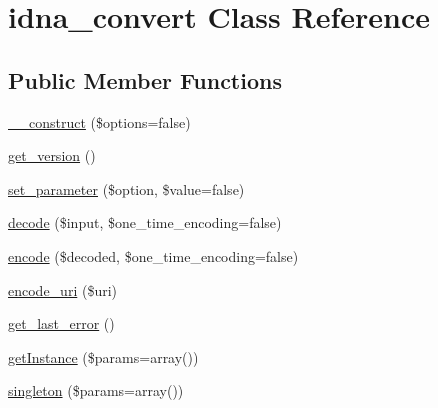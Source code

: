 \hypertarget{classidna__convert}{\section{idna\-\_\-convert Class Reference}
\label{classidna__convert}
}
\subsection*{Public Member Functions}
\begin{DoxyCompactItemize}
\item 
\hyperlink{classidna__convert_a41c710240381df950f03e3a7e4648a1e}{\-\_\-\-\_\-construct} (\$options=false)
\item 
\hyperlink{classidna__convert_a59d30af851a16b87ac00a96931fe7e61}{get\-\_\-version} ()
\item 
\hyperlink{classidna__convert_a1efc37a8bd5f6b08eed75e0b8e6f074d}{set\-\_\-parameter} (\$option, \$value=false)
\item 
\hyperlink{classidna__convert_a845094b11b91976cea00bd9b9e022cd5}{decode} (\$input, \$one\-\_\-time\-\_\-encoding=false)
\item 
\hyperlink{classidna__convert_ae6e83c86d02d1ad9b8a7eb48435863bd}{encode} (\$decoded, \$one\-\_\-time\-\_\-encoding=false)
\item 
\hyperlink{classidna__convert_a21b3f0bb158b689c9d835bb1c7a30114}{encode\-\_\-uri} (\$uri)
\item 
\hyperlink{classidna__convert_adcf7a0902a83a834ce05fc34a460fccd}{get\-\_\-last\-\_\-error} ()
\item 
\hyperlink{classidna__convert_aff2ec039994038d13c8000addff58de3}{get\-Instance} (\$params=array())
\item 
\hyperlink{classidna__convert_a899f287645e43d1fd44a627cdb6b0e79}{singleton} (\$params=array())
\end{DoxyCompactItemize}
